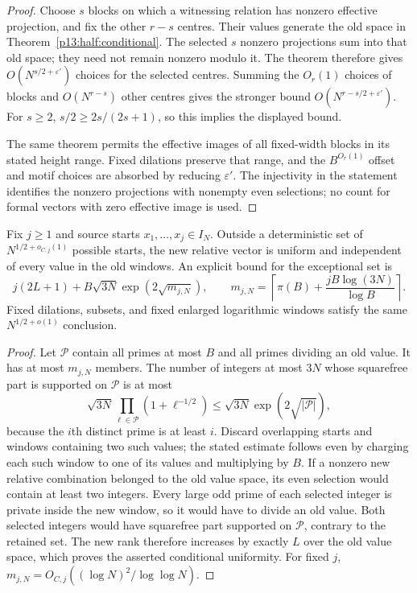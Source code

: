 \begin{proof}
Choose $s$ blocks on which a witnessing relation has nonzero effective
projection, and fix the other $r-s$ centres. Their values generate the
old space in Theorem~\ref{p13:half:conditional}. The selected $s$
nonzero projections sum into that old space; they need not remain
nonzero modulo it. The theorem therefore gives
$O(N^{s/2+\varepsilon'})$ choices for the selected centres.
Summing the $O_r(1)$ choices of blocks and $O(N^{r-s})$ other centres
gives the stronger bound $O(N^{r-s/2+\varepsilon'})$.
For $s\ge2$, $s/2\ge2s/(2s+1)$, so this implies the displayed bound.

The same theorem permits the effective images of all fixed-width blocks
in its stated height range. Fixed dilations preserve that range, and
the $B^{O_r(1)}$ offset and motif choices are absorbed by reducing
$\varepsilon'$. The injectivity in the statement identifies the
nonzero projections with nonempty even selections; no count for
formal vectors with zero effective image is used.
\end{proof}

\begin{proposition}
\label{p1:arith:fixed-branching}
Fix $j\geq1$ and source starts $x_1,\ldots,x_j\in I_N$.
Outside a deterministic set of $N^{1/2+o_{C,j}(1)}$ possible starts,
the new relative vector is uniform and independent of every value in
the old windows.  An explicit bound for the exceptional set is
\[
 j(2L+1)+B\sqrt{3N}\exp(2\sqrt{m_{j,N}}),\qquad
 m_{j,N}=\left\lceil\pi(B)+\frac{jB\log(3N)}{\log B}\right\rceil.
\]
Fixed dilations, subsets, and fixed enlarged logarithmic windows satisfy
the same $N^{1/2+o(1)}$ conclusion.
\end{proposition}

\begin{proof}
Let $\mathcal P$ contain all primes at most $B$ and all primes dividing
an old value.  It has at most $m_{j,N}$ members.
The number of integers at most $3N$ whose squarefree part is supported
on $\mathcal P$ is at most
\[
 \sqrt{3N}\prod_{\ell\in\mathcal P}(1+\ell^{-1/2})
 \leq\sqrt{3N}\exp(2\sqrt{|\mathcal P|}),
\]
because the $i$th distinct prime is at least $i$.
Discard overlapping starts and windows containing two such values;
the stated estimate follows even by charging each such window to one
of its values and multiplying by $B$.
If a nonzero new relative combination belonged to the old value space,
its even selection would contain at least two integers.  Every large
odd prime of each selected integer is private inside the new window,
so it would have to divide an old value.  Both selected integers would
have squarefree part supported on $\mathcal P$, contrary to the retained
set.  The new rank therefore increases by exactly $L$ over the old
value space, which proves the asserted conditional uniformity.
For fixed $j$, $m_{j,N}=O_{C,j}((\log N)^2/\log\log N)$.
\end{proof}

